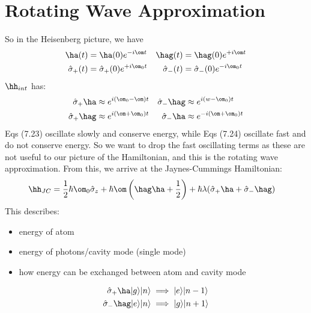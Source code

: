 \documentclass[a4paper, 11pt, normalem]{report}
\newcommand\hsig{\hat{\sigma}}
\begin{document}
\section{Rotating Wave Approximation}
So in the Heisenberg picture, we have
\begin{align}
    \ha(t) &= \ha(0)e^{-i\om t} & \hag(t) &= \hag(0)e^{+i\om t} \\
    \hsig_+(t) &= \hsig_+(0)e^{+i\om_0t} & \hsig_-(t) &= \hsig_-(0)e^{-i\om_0 t} 
\end{align}
$\hh_{int}$ has:
\begin{align}
    \hsig_+\ha &\approx e^{i(\om_0-\om)t} & \hsig_-\hag &\approx e^{i(w-\om_0)t} \\
    \hsig_+\hag &\approx e^{i(\om+\om_0)t} & \hsig_-\ha &\approx e^{-i(\om+\om_0)t}
\end{align}
Eqs (7.23) oscillate slowly and conserve energy, while Eqs (7.24) oscillate fast and do not conserve energy.
So we want to drop the fast oscillating terms as these are not useful to our picture of the Hamiltonian, and this is the rotating wave approximation. 
From this, we arrive at the Jaynes-Cummings Hamiltonian:
\begin{align}
    \hh_{JC} &= \frac12\hbar\om_0\hsig_z + \hbar\om\left(\hag\ha+\frac12\right) + \hbar\lambda(\hsig_+\ha +\hsig_-\hag)
\end{align}
This describes: 
\begin{itemize}
    \item energy of atom
    \item energy of photons/cavity mode (single mode)
    \item how energy can be exchanged between atom and cavity mode
\end{itemize}
\begin{align}
    \hsig_+\ha|g\rangle|n\rangle &\implies |e\rangle|n-1\rangle \\
    \hsig_-\hag|e\rangle|n\rangle &\implies |g\rangle|n+1\rangle
\end{align}
\end{document}
